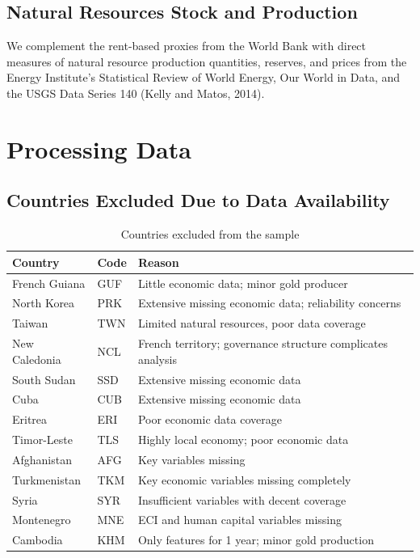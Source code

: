 \documentclass[12pt,a4paper]{report}
\begin{document}
\begin{appendices}
\section{Natural Resources Stock and Production}

We complement the rent-based proxies from the World Bank with direct measures of natural resource production quantities, reserves, and prices from the Energy Institute's Statistical Review of World Energy, Our World in Data, and the USGS Data Series 140 (Kelly and Matos, 2014).


\chapter{Processing Data}

\section{Countries Excluded Due to Data Availability}

\begin{table}[H]
\centering
\caption{Countries excluded from the sample}
\small
\begin{tabular}{@{}llp{10cm}@{}}
\toprule
\textbf{Country} & \textbf{Code} & \textbf{Reason} \\
\midrule
French Guiana & GUF & Little economic data; minor gold producer \\
North Korea & PRK & Extensive missing economic data; reliability concerns \\
Taiwan & TWN & Limited natural resources, poor data coverage \\
New Caledonia & NCL & French territory; governance structure complicates analysis \\
South Sudan & SSD & Extensive missing economic data \\
Cuba & CUB & Extensive missing economic data \\
Eritrea & ERI & Poor economic data coverage \\
Timor-Leste & TLS & Highly local economy; poor economic data \\
Afghanistan & AFG & Key variables missing \\
Turkmenistan & TKM & Key economic variables missing completely \\
Syria & SYR & Insufficient variables with decent coverage \\
Montenegro & MNE & ECI and human capital variables missing \\
Cambodia & KHM & Only features for 1 year; minor gold production \\
\bottomrule
\end{tabular}
\label{tab:excluded_countries}
\end{table}


\end{appendices}
\end{document}

